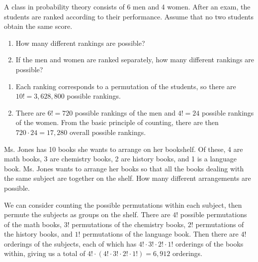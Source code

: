 \begin{changebar}
    \begin{example}
        A class in probability theory consists of 6 men and 4 women. After an exam, the students are ranked according to their performance. Assume that no two students obtain the same score. \begin{enumerate}[label=(\alph*)]
            \item How many different rankings are possible?
            \item If the men and women are ranked separately, how many different rankings are possible?
        \end{enumerate}
    \end{example}
    \begin{solution}\hfill
        \begin{enumerate}[label=(\alph*)]
            \item Each ranking corresponds to a permutation of the students, so there are $10! = 3{,}628{,}800$ possible rankings.
            \item There are $6! = 720$ possible rankings of the men and $4! = 24$ possible rankings of the women. From the basic principle of counting, there are then $720\cdot 24 = 17{,}280$ overall possible rankings.
        \end{enumerate}
    \end{solution}
\end{changebar}

\begin{changebar}
    \begin{example}
        Ms. Jones has 10 books she wants to arrange on her bookshelf. Of these, 4 are math books, 3 are chemistry books, 2 are history books, and 1 is a language book. Ms. Jones wants to arrange her books so that all the books dealing with the same subject are together on the shelf. How many different arrangements are possible.
    \end{example}
    \begin{solution}
        We can consider counting the possible permutations within each subject, then permute the subjects as groups on the shelf. There are $4!$ possible permutations of the math books, $3!$ permutations of the chemistry books, $2!$ permutations of the history books, and $1!$ permutations of the language book. Then there are $4!$ orderings of the subjects, each of which has $4! \cdot 3! \cdot 2! \cdot 1!$ orderings of the books within, giving us a total of $4!\cdot(4!\cdot3!\cdot2!\cdot1!) = 6{,}912$ orderings.
    \end{solution}
\end{changebar}

